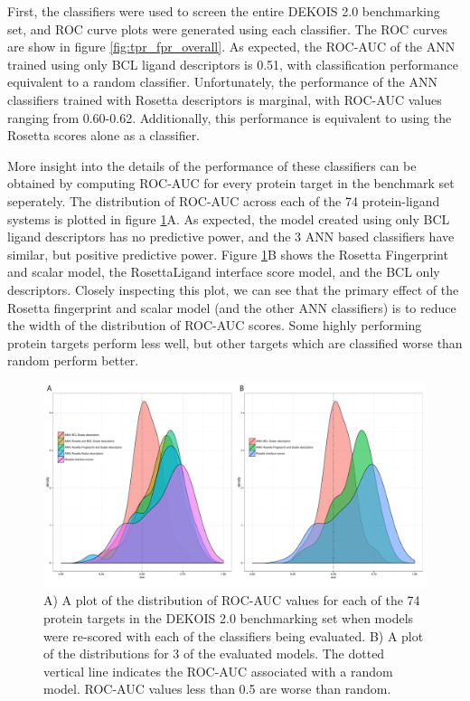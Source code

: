 First, the classifiers were used to screen the entire DEKOIS 2.0 benchmarking set, and \ac{ROC} curve plots were generated using each classifier.
The \ac{ROC} curves are show in figure \ref{fig:tpr_fpr_overall}.
As expected, the \ac{ROC-AUC} of the \ac{ANN} trained using only BCL ligand descriptors is 0.51, with classification performance equivalent to a random classifier.
Unfortunately, the performance of the ANN classifiers trained with Rosetta descriptors is marginal, with \ac{ROC-AUC} values ranging from 0.60-0.62.
Additionally, this performance is equivalent to using the Rosetta scores alone as a classifier.

More insight into the details of the performance of these classifiers can be obtained by computing \ac{ROC-AUC} for every protein target in the benchmark set seperately.
The distribution of \ac{ROC-AUC} across each of the 74 protein-ligand systems is plotted in figure \ref{fig:dekois_roc_all}A.
As expected, the model created using only \ac{BCL} ligand descriptors has no predictive power, and the 3 \ac{ANN} based classifiers have similar, but positive predictive power.
Figure \ref{fig:dekois_roc_all}B shows the Rosetta Fingerprint and scalar model, the RosettaLigand interface score model, and the \ac{BCL} only descriptors.
Closely inspecting this plot, we can see that the primary effect of the Rosetta fingerprint and scalar model (and the other \ac{ANN} classifiers) is to reduce the width of the distribution of \ac{ROC-AUC} scores.  Some highly performing protein targets perform less well, but other targets which are classified worse than random perform better. 
\begin{figure}
\centering
\includegraphics[width=6in]{figures/hts/auc_distributions.pdf}
\caption{
A) A plot of the distribution of \acs{ROC-AUC} values for each of the 74 protein targets in the DEKOIS 2.0 benchmarking set when models were re-scored with each of the classifiers being evaluated.
B) A plot of the distributions for 3 of the evaluated models.
The dotted vertical line indicates the \acs{ROC-AUC} associated with a random model.
\acs{ROC-AUC} values less than 0.5 are worse than random. 
}
\label{fig:dekois_roc_all}
\end{figure}
